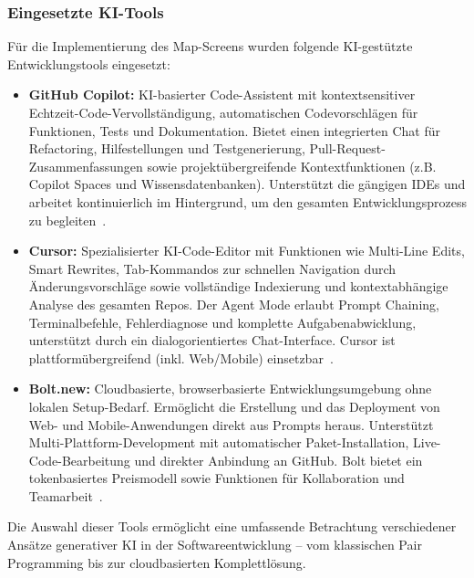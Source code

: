 \subsubsection{Eingesetzte KI-Tools}

Für die Implementierung des Map-Screens wurden folgende KI-gestützte
Entwicklungstools eingesetzt:

\begin{itemize}
      \item \textbf{GitHub Copilot:} KI-basierter Code-Assistent mit kontextsensitiver Echtzeit-Code-Vervollständigung, automatischen Codevorschlägen für Funktionen, Tests und Dokumentation. Bietet einen integrierten Chat für Refactoring, Hilfestellungen und Testgenerierung, Pull-Request-Zusammenfassungen sowie projektübergreifende Kontextfunktionen (z.B. Copilot Spaces und Wissensdatenbanken). Unterstützt die gängigen IDEs und arbeitet kontinuierlich im Hintergrund, um den gesamten Entwicklungsprozess zu begleiten~\cite{github_copilot_2025}.
      \item \textbf{Cursor:} Spezialisierter KI-Code-Editor mit Funktionen wie Multi-Line Edits, Smart Rewrites, Tab-Kommandos zur schnellen Navigation durch Änderungsvorschläge sowie vollständige Indexierung und kontextabhängige Analyse des gesamten Repos. Der Agent Mode erlaubt Prompt Chaining, Terminalbefehle, Fehlerdiagnose und komplette Aufgabenabwicklung, unterstützt durch ein dialogorientiertes Chat-Interface. Cursor ist plattformübergreifend (inkl. Web/Mobile) einsetzbar~\cite{cursor_welcome_2025}.
      \item \textbf{Bolt.new:} Cloudbasierte, browserbasierte Entwicklungsumgebung ohne lokalen Setup-Bedarf. Ermöglicht die Erstellung und das Deployment von Web- und Mobile-Anwendungen direkt aus Prompts heraus. Unterstützt Multi-Plattform-Development mit automatischer Paket-Installation, Live-Code-Bearbeitung und direkter Anbindung an GitHub. Bolt bietet ein tokenbasiertes Preismodell sowie Funktionen für Kollaboration und Teamarbeit~\cite{bolt_support_2025}.
\end{itemize}

Die Auswahl dieser Tools ermöglicht eine umfassende Betrachtung verschiedener
Ansätze generativer KI in der Softwareentwicklung – vom klassischen Pair
Programming bis zur cloudbasierten Komplettlösung.

